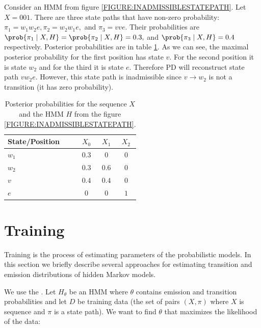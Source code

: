 \begin{example}
Consider an HMM from figure \ref{FIGURE:INADMISSIBLESTATEPATH}. Let $X=001$. There
are three state paths that have non-zero probability:
$\pi_1=w_1w_2e,\pi_2=w_2w_1e,$ and $\pi_3=vve$. Their probabilities are
$\prob{\pi_1\mid X,H}=\prob{\pi_2\mid X,H}=0.3,$ and $\prob{\pi_3\mid X,H}=0.4$
respectively.
Posterior probabilities are in table \ref{TABLE:INADMISSIBLESTATEPATH}.
As we can see, the maximal posterior probability for the first position has state
$v$. For the second position it is state $w_2$ and for the third it is state
$e$. Therefore PD will reconstruct state path $vw_2e$. However, this state path 
is inadmissible since  $v\to w_2$ is not a transition (it has zero probability).

\begin{table}
\begin{center}
\begin{tabular}{|l|c|c|c|}
\hline
State/Position & $X_0$ & $X_1$ & $X_2$ \\\hline
$w_1$ & $0.3$ & $0$ & $0$ \\\hline
$w_2$ & $0.3$ & $0.6$ & $0$ \\\hline
$v$   & $0.4$ & $0.4$ & $0$\\\hline
$e$  & $0$ & $0$ & $1$ \\\hline
\end{tabular}
\end{center}
\caption[Example of posterior probabilities.]{Posterior probabilities for
the sequence $X$ and the HMM $H$ from the figure \ref{FIGURE:INADMISSIBLESTATEPATH}.
}\label{TABLE:INADMISSIBLESTATEPATH}
\end{table}

\end{example}


\section{Training} 

Training is the process of estimating parameters of the probabilistic models. In this
section we briefly describe several approaches for estimating transition and
emission distributions of hidden Markov models.

We use the . Let $H_{\theta}$ be an HMM
where $\theta$ contains emission and transition probabilities and
let $D$ be training data (the set of pairs $(X,\pi)$ where $X$ is sequence and $\pi$ is a state path).  We
want to find $\theta$ that maximizes the likelihood of the data:

